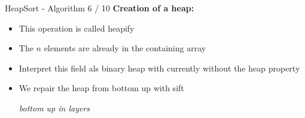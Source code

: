 \documentclass[notes=hide,pdftex,14pt]{beamer}
\begin{document}

\begin{frame}{HeapSort - Algorithm 6 / 10}
  \textbf{Creation of a heap:}
  \begin{itemize}[<+->]
    \item
      This operation is called {\color{Mittel-Blau}heapify}
    \item
      The {\color{Mittel-Blau}$n$} elements are already in the containing array
    \item
      Interpret this field als binary heap with currently without the
      {\color{Mittel-Blau}heap property}
    \item
      We repair the heap from bottom up with {\color{Mittel-Blau}sift}
      \begin{center}
        \textit{bottom up in layers}
      \end{center}
  \end{itemize}
\end{frame}

\end{document}
